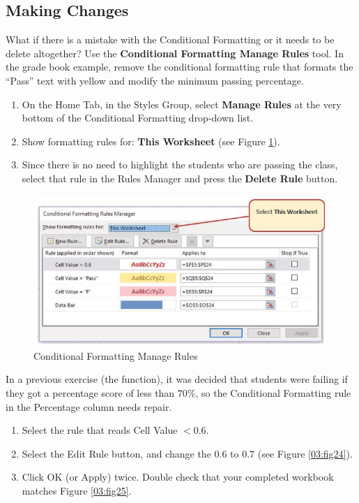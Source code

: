 \subsection{Making Changes}

What if there is a mistake with the Conditional Formatting or it needs to be delete altogether? Use the \textbf{Conditional Formatting Manage Rules} tool. In the grade book example, remove the conditional formatting rule that formats the ``Pass'' text with yellow and modify the minimum passing percentage.

\begin{enumerate}
	\item On the Home Tab, in the Styles Group, select \textbf{Manage Rules} at the very bottom of the Conditional Formatting drop-down list.
	\item Show formatting rules for: \textbf{This Worksheet} (see Figure \ref{03:fig23}).
	\item Since there is no need to highlight the students who are passing the class, select that rule in the Rules Manager and press the \textbf{Delete Rule} button.
\end{enumerate}

\begin{figure}[H]
	\centering
	\includegraphics[width=\maxwidth{.95\linewidth}]{gfx/ch03_fig23}
	\caption{Conditional Formatting Manage Rules}
	\label{03:fig23}
\end{figure}

In a previous exercise (the  function), it was decided that students were failing if they got a percentage score of less than $ 70\% $, so the Conditional Formatting rule in the Percentage column needs repair.

\begin{enumerate}[resume]
	\item Select the rule that reads Cell Value $ <0.6 $.
	\item Select the Edit Rule button, and change the $ 0.6 $ to $ 0.7 $ (see Figure \ref{03:fig24}).
	\item Click OK (or Apply) twice. Double check that your completed workbook matches Figure \ref{03:fig25}.
\end{enumerate}

